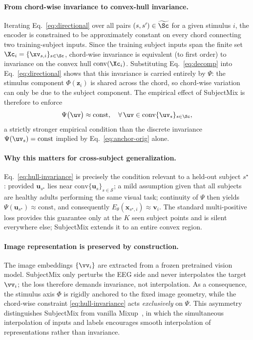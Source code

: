 \paragraph{From chord-wise invariance to convex-hull invariance.}
Iterating Eq.~\eqref{eq:directional} over all pairs
$(s,s')\in\widetilde{\Sc}$ for a given stimulus $i$, the encoder
is constrained to be approximately constant on every chord connecting
two training-subject inputs. Since the training subject inputs span the
finite set $\Xc_i=\{\xv_{s,i}\}_{s\in\Sc}$,
chord-wise invariance is equivalent (to first order) to invariance on
the convex hull
$\mathrm{conv}(\Xc_i)$. Substituting
Eq.~\eqref{eq:decomp} into Eq.~\eqref{eq:directional} shows that
this invariance is carried entirely by $\Psi$: the stimulus component
$\Phi(\mathbf{z}_i)$ is shared across the chord, so chord-wise variation
can only be due to the subject component. The empirical effect of
SubjectMix is therefore to enforce
\begin{equation}
    \Psi\bigl(\uv\bigr)\approx\mathrm{const},
    \quad\forall\,\uv\in\mathrm{conv}\{\uv_s\}_{s\in\Sc},
    \label{eq:hull-invariance}
\end{equation}
a strictly stronger empirical condition than the discrete invariance
$\Psi(\uv_s)=\mathrm{const}$ implied by
Eq.~\eqref{eq:anchor-orig} alone.
\paragraph{Why this matters for cross-subject generalization.}
Eq.~\eqref{eq:hull-invariance} is precisely the condition relevant to a
held-out subject $s^\star$: provided $\mathbf{u}_{s^\star}$ lies near
$\mathrm{conv}\{\mathbf{u}_s\}_{s\in\mathcal{S}}$; a mild assumption
given that all subjects are healthy adults performing the same visual
task; continuity of $\Psi$ then yields
$\Psi(\mathbf{u}_{s^\star})\approx\mathrm{const}$, and consequently
$E_\theta(\mathbf{x}_{s^\star,i})\approx\mathbf{v}_i$. The standard
multi-positive loss provides this guarantee only at the $K$ seen
subject points and is silent everywhere else; SubjectMix extends it to
an entire convex region.

\paragraph{Image representation is preserved by construction.}
The image embeddings $\{\vv_i\}$ are extracted from a frozen
pretrained vision model. SubjectMix only perturbs the EEG side and
never interpolates the target $\vv_i$; the loss therefore demands
invariance, not interpolation. As a consequence, the stimulus axis
$\Phi$ is rigidly anchored to the fixed image geometry, while the
chord-wise constraint
\eqref{eq:hull-invariance} acts \emph{exclusively} on $\Psi$. This
asymmetry distinguishes SubjectMix from vanilla
Mixup~\cite{zhang2018mixup}, in which the simultaneous interpolation of
inputs and labels encourages smooth interpolation of representations
rather than invariance.

